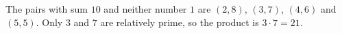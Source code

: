 The pairs with sum $10$ and neither number $1$ are $(2,8)$, $(3,7)$, $(4,6)$ and $(5,5)$. Only $3$ and $7$ are relatively prime, so the product is $3\cdot7=\boxed{21}$.
